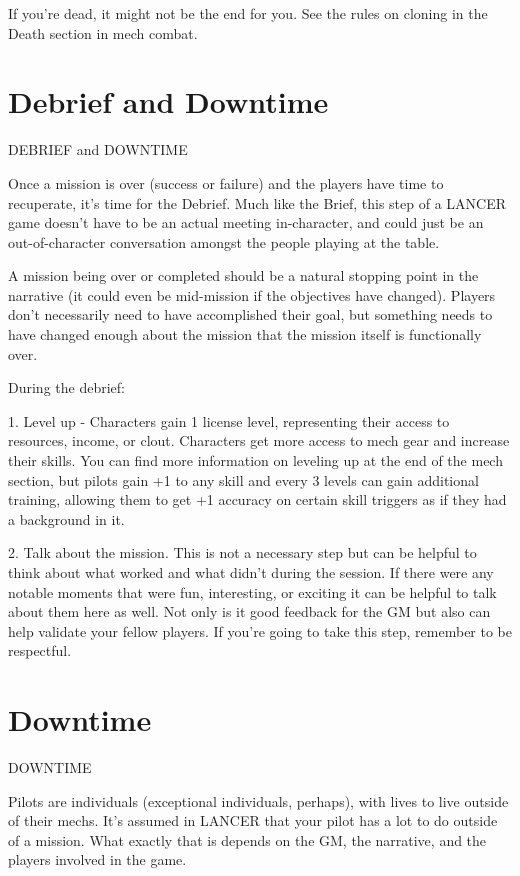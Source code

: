 If you’re dead, it might not be the end for you. See the rules on cloning in the Death section in
mech combat.

\chapter{Debrief and Downtime}

                      DEBRIEF and DOWNTIME


Once a mission is over (success or failure) and the players have time to recuperate, it’s time for
the Debrief. Much like the Brief, this step of a LANCER game doesn’t have to be an actual
meeting in-character, and could just be an out-of-character conversation amongst the people
playing at the table.


A mission being over or completed should be a natural stopping point in the narrative (it could
even be mid-mission if the objectives have changed). Players don’t necessarily need to have
accomplished their goal, but something needs to have changed enough about the mission that
the mission itself is functionally over.


During the debrief:

	        1. Level up - Characters gain 1 license level, representing their access to resources,
income, or clout. Characters get more access to mech gear and increase their skills. You can find
more information on leveling up at the end of the mech section, but pilots gain +1 to any skill and
every 3 levels can gain additional training, allowing them to get +1 accuracy on certain skill
triggers as if they had a background in it.

	        2. Talk about the mission. This is not a necessary step but can be helpful to think about
what worked and what didn’t during the session. If there were any notable moments that were
fun, interesting, or exciting it can be helpful to talk about them here as well. Not only is it good
feedback for the GM but also can help validate your fellow players. If you’re going to take this
step, remember to be respectful.


\chapter{Downtime}
                                             DOWNTIME


Pilots are individuals (exceptional individuals, perhaps), with lives to live outside of their mechs.
It’s assumed in LANCER that your pilot has a lot to do outside of a mission. What exactly that is
depends on the GM, the narrative, and the players involved in the game.


